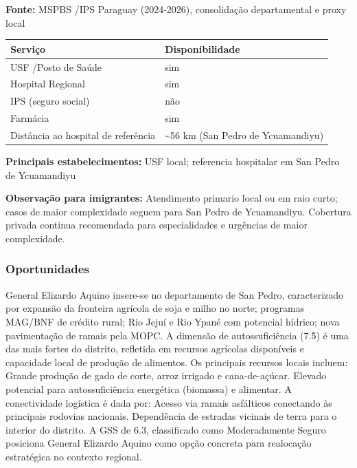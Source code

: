 \textbf{Fonte:} MSPBS /\allowbreak  IPS Paraguay (2024-2026), consolidação
departamental e proxy local

{\def\LTcaptype{none} %
\begin{longtable}[]{@{}
  >{\raggedright\arraybackslash}p{}
  >{\raggedright\arraybackslash}p{}@{}}
\toprule\noalign{}
\begin{minipage}[b]{\linewidth}\raggedright
Serviço
\end{minipage} & \begin{minipage}[b]{\linewidth}\raggedright
Disponibilidade
\end{minipage} \\
\midrule\noalign{}
\endhead
\bottomrule\noalign{}
\endlastfoot
USF /\allowbreak  Posto de Saúde & sim \\
Hospital Regional & sim \\
IPS (seguro social) & não \\
Farmácia & sim \\
Distância ao hospital de referência & \textasciitilde56 km (San Pedro de
Ycuamandiyu) \\
\end{longtable}
}

\textbf{Principais estabelecimentos:} USF local; referencia hospitalar
em San Pedro de Ycuamandiyu

\textbf{Observação para imigrantes:} Atendimento primario local ou em
raio curto; casos de maior complexidade seguem para San Pedro de
Ycuamandiyu. Cobertura privada continua recomendada para especialidades
e urgências de maior complexidade.
\newpage

\subsubsection*{Oportunidades}\label{oport-general-elizardo-aquino-0204}
General Elizardo Aquino insere-se no departamento de San Pedro, caracterizado por expansão da fronteira agrícola de soja e milho no norte; programas MAG/BNF de crédito rural; Rio Jejuí e Rio Ypané com potencial hídrico; nova pavimentação de ramais pela MOPC. A dimensão de autossuficiência (7.5) é uma das mais fortes do distrito, refletida em recursos agrícolas disponíveis e capacidade local de produção de alimentos. Os principais recursos locais incluem: Grande produção de gado de corte, arroz irrigado e cana-de-açúcar. Elevado potencial para autossuficiência energética (biomassa) e alimentar. A conectividade logística é dada por: Acesso via ramais asfálticos conectando às principais rodovias nacionais. Dependência de estradas vicinais de terra para o interior do distrito. A GSS de 6.3, classificado como Moderadamente Seguro posiciona General Elizardo Aquino como opção concreta para realocação estratégica no contexto regional.

